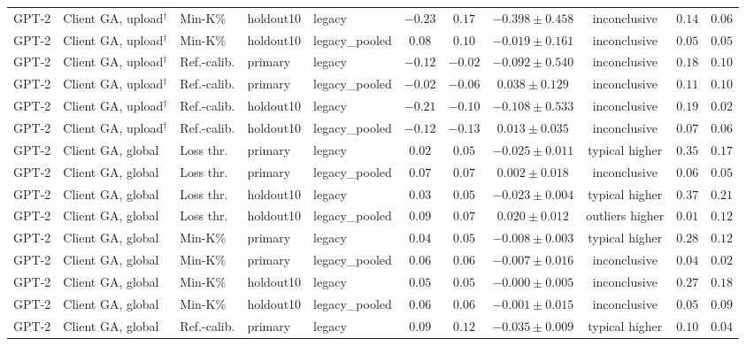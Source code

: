 {\begin{longtable}{@{\extracolsep{\fill}}lllllcccccc@{}}
GPT-2 & Client GA, upload$^{\dagger}$ & Min-K\% & holdout10 & legacy & $-0.23$ & $0.17$ & $-0.398 \pm 0.458$ & inconclusive & $0.14$ & $0.06$ \\
GPT-2 & Client GA, upload$^{\dagger}$ & Min-K\% & holdout10 & legacy\_pooled & $0.08$ & $0.10$ & $-0.019 \pm 0.161$ & inconclusive & $0.05$ & $0.05$ \\
GPT-2 & Client GA, upload$^{\dagger}$ & Ref.-calib. & primary & legacy & $-0.12$ & $-0.02$ & $-0.092 \pm 0.540$ & inconclusive & $0.18$ & $0.10$ \\
GPT-2 & Client GA, upload$^{\dagger}$ & Ref.-calib. & primary & legacy\_pooled & $-0.02$ & $-0.06$ & $0.038 \pm 0.129$ & inconclusive & $0.11$ & $0.10$ \\
GPT-2 & Client GA, upload$^{\dagger}$ & Ref.-calib. & holdout10 & legacy & $-0.21$ & $-0.10$ & $-0.108 \pm 0.533$ & inconclusive & $0.19$ & $0.02$ \\
GPT-2 & Client GA, upload$^{\dagger}$ & Ref.-calib. & holdout10 & legacy\_pooled & $-0.12$ & $-0.13$ & $0.013 \pm 0.035$ & inconclusive & $0.07$ & $0.06$ \\
GPT-2 & Client GA, global & Loss thr. & primary & legacy & $0.02$ & $0.05$ & $-0.025 \pm 0.011$ & typical higher & $0.35$ & $0.17$ \\
GPT-2 & Client GA, global & Loss thr. & primary & legacy\_pooled & $0.07$ & $0.07$ & $0.002 \pm 0.018$ & inconclusive & $0.06$ & $0.05$ \\
GPT-2 & Client GA, global & Loss thr. & holdout10 & legacy & $0.03$ & $0.05$ & $-0.023 \pm 0.004$ & typical higher & $0.37$ & $0.21$ \\
GPT-2 & Client GA, global & Loss thr. & holdout10 & legacy\_pooled & $0.09$ & $0.07$ & $0.020 \pm 0.012$ & outliers higher & $0.01$ & $0.12$ \\
GPT-2 & Client GA, global & Min-K\% & primary & legacy & $0.04$ & $0.05$ & $-0.008 \pm 0.003$ & typical higher & $0.28$ & $0.12$ \\
GPT-2 & Client GA, global & Min-K\% & primary & legacy\_pooled & $0.06$ & $0.06$ & $-0.007 \pm 0.016$ & inconclusive & $0.04$ & $0.02$ \\
GPT-2 & Client GA, global & Min-K\% & holdout10 & legacy & $0.05$ & $0.05$ & $-0.000 \pm 0.005$ & inconclusive & $0.27$ & $0.18$ \\
GPT-2 & Client GA, global & Min-K\% & holdout10 & legacy\_pooled & $0.06$ & $0.06$ & $-0.001 \pm 0.015$ & inconclusive & $0.05$ & $0.09$ \\
GPT-2 & Client GA, global & Ref.-calib. & primary & legacy & $0.09$ & $0.12$ & $-0.035 \pm 0.009$ & typical higher & $0.10$ & $0.04$ \\

\end{longtable}}

